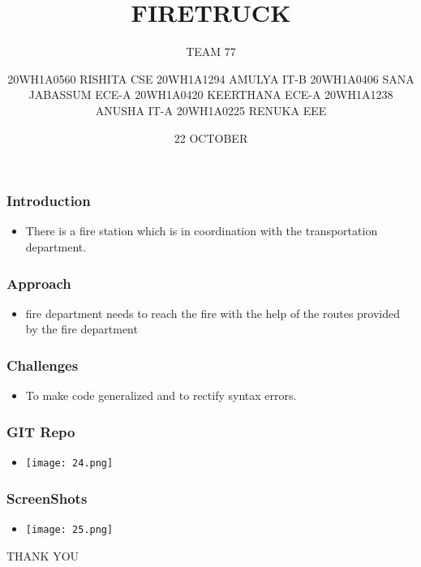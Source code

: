 \documentclass[14pt]{beamer}
\title{FIRETRUCK}
\date{22 OCTOBER}
\subtitle{TEAM 77}
\author[Bvrith]{
                20WH1A0560 RISHITA CSE 
                20WH1A1294 AMULYA  IT-B
                20WH1A0406 SANA JABASSUM ECE-A
                20WH1A0420 KEERTHANA   ECE-A
                20WH1A1238 ANUSHA  IT-A
                20WH1A0225 RENUKA EEE
                }
\begin{document}
    \begin{frame}
        \titlepage
    \end{frame}
    \begin{frame}
	\frametitle{Introduction}
        \begin{itemize}
	    \item There is a fire station which is in coordination with the transportation department.
	\end{itemize}
    \end{frame}
    \begin{frame}
	\frametitle{Approach}
	\begin{itemize}
	    \item 
	     fire department needs to reach the fire with the help of the routes provided by the fire department
	\end{itemize}
    \end{frame}
    \begin{frame}
	\frametitle{Challenges}
        \begin{itemize}
	    \item {To make code generalized
	          and to rectify syntax errors.}
        \end{itemize}
    \end{frame}
    \begin{frame}
	\frametitle{GIT Repo}
	\begin{itemize}
		\item \texttt{[image: 24.png]}
	\end{itemize}
    \end{frame}
    \begin{frame}
	\frametitle{ScreenShots}
	\begin{itemize}
	    \item \texttt{[image: 25.png]}
	\end{itemize}
    \end{frame}
    \begin{frame}
	\begin{center}
	     THANK YOU
	\end{center}
    \end{frame}
\end{document}

